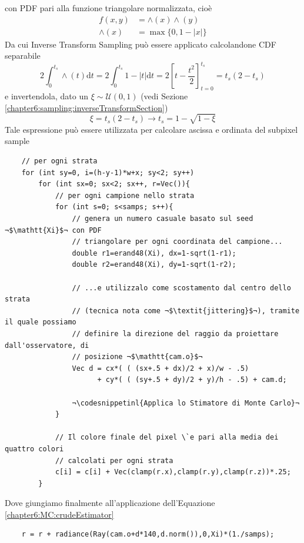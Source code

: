 con PDF pari alla funzione triangolare normalizzata, cio\`e
\begin{align}
	f(x,y)&=\wedge(x)\wedge(y) \\
	\wedge(x)&=\max\{0,1-|x|\}\nonumber
\end{align}
Da cui Inverse Transform Sampling pu\`o essere applicato calcolandone CDF separabile
\begin{equation}
	2\int_0^{t_s}\wedge(t)\mathrm{d}t=2\int_0^{t_s}1-|t|\mathrm{d}t=2\left[t-\frac{t^2}{2}\right]_{t=0}^{t_s}=t_s(2-t_s)
\end{equation}
e invertendola, dato un $\xi\sim\mathcal{U}(0,1)$ (vedi Sezione \ref{chapter6:sampling:inverseTransformSection})
\begin{equation}
	\xi=t_s(2-t_s)\longrightarrow t_s=1-\sqrt{1-\xi}
\end{equation}
Tale espressione pu\`o essere utilizzata per calcolare ascissa e ordinata del subpixel sample
\begin{verbatim}
	// per ogni strata
	for (int sy=0, i=(h-y-1)*w+x; sy<2; sy++)     
		for (int sx=0; sx<2; sx++, r=Vec()){        
			// per ogni campione nello strata
			for (int s=0; s<samps; s++){ 
				// genera un numero casuale basato sul seed ¬$\mathtt{Xi}$¬ con PDF 
				// triangolare per ogni coordinata del campione...
				double r1=erand48(Xi), dx=1-sqrt(1-r1); 
				double r2=erand48(Xi), dy=1-sqrt(1-r2); 

				// ...e utilizzalo come scostamento dal centro dello strata 
				// (tecnica nota come ¬$\textit{jittering}$¬), tramite il quale possiamo
				// definire la direzione del raggio da proiettare dall'osservatore, di 
				// posizione ¬$\mathtt{cam.o}$¬
				Vec d = cx*( ( (sx+.5 + dx)/2 + x)/w - .5) 
					  + cy*( ( (sy+.5 + dy)/2 + y)/h - .5) + cam.d; 

				¬\codesnippetinl{Applica lo Stimatore di Monte Carlo}¬
			} 

			// Il colore finale del pixel \`e pari alla media dei quattro colori 
			// calcolati per ogni strata
			c[i] = c[i] + Vec(clamp(r.x),clamp(r.y),clamp(r.z))*.25; 
		} 
\end{verbatim}
Dove giungiamo finalmente all'applicazione dell'Equazione \ref{chapter6:MC:crudeEstimator}
\begin{verbatim}
	r = r + radiance(Ray(cam.o+d*140,d.norm()),0,Xi)*(1./samps); 
\end{verbatim}
